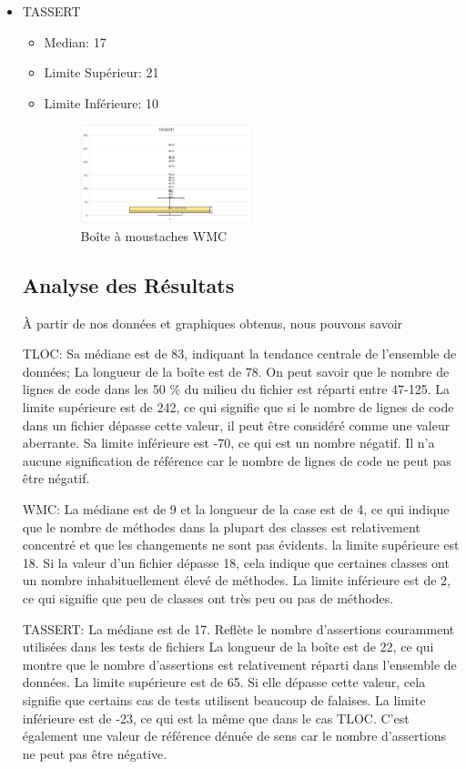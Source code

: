 \documentclass{proc}
\begin{document}
\begin{itemize}
\item{TASSERT}
\begin{itemize}
    \item Median: 17
    \item Limite Supérieur: 21
    \item Limite Inférieure: 10
    \begin{figure}[H]
    \centering
    \includegraphics[width=0.5\textwidth]{images/TASSERT.png}
    \caption{Boîte à moustaches WMC}
    \label{fig:TASSERT.png}
    \end{figure}
\end{itemize}


\subsection{Analyse des Résultats}
À partir de nos données et graphiques obtenus, nous pouvons savoir

TLOC: 
Sa médiane est de 83, indiquant la tendance centrale de l'ensemble de données;
La longueur de la boîte est de 78. On peut savoir que le nombre de lignes de code dans les 50 \% du milieu du fichier est réparti entre 47-125.
La limite supérieure est de 242, ce qui signifie que si le nombre de lignes de code dans un fichier dépasse cette valeur, il peut être considéré comme une valeur aberrante.
Sa limite inférieure est -70, ce qui est un nombre négatif. Il n'a aucune signification de référence car le nombre de lignes de code ne peut pas être négatif.

WMC:
La médiane est de 9 et la longueur de la case est de 4, ce qui indique que le nombre de méthodes dans la plupart des classes est relativement concentré et que les changements ne sont pas évidents.
la limite supérieure est 18. Si la valeur d'un fichier dépasse 18, cela indique que certaines classes ont un nombre inhabituellement élevé de méthodes.
La limite inférieure est de 2, ce qui signifie que peu de classes ont très peu ou pas de méthodes.

TASSERT:
La médiane est de 17. Reflète le nombre d'assertions couramment utilisées dans les tests de fichiers
La longueur de la boîte est de 22, ce qui montre que le nombre d'assertions est relativement réparti dans l'ensemble de données.
La limite supérieure est de 65. Si elle dépasse cette valeur, cela signifie que certains cas de tests utilisent beaucoup de falaises.
La limite inférieure est de -23, ce qui est la même que dans le cas TLOC. C'est également une valeur de référence dénuée de sens car le nombre d'assertions ne peut pas être négative.


\end{itemize}
\end{document}
